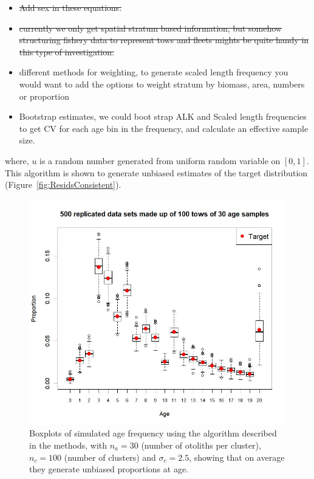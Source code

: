 \begin{itemize}
	\item \sout{Add sex in these equations.}
	\item \sout{currently we only get spatial stratum based information, but somehow structuring fishery data to represent tows and fleets mights be quite handy in this type of investigation.}
	\item different methods for weighting, to generate scaled length frequency you would want to add the options to weight stratum by biomass, area, numbers or proportion
	\item Bootstrap estimates, we could boot strap ALK and Scaled length frequencies to get CV for each age bin in the frequency, and calculate an effective sample size.
\end{itemize}
where, $u$ is a random number generated from uniform random variable on $[0,1]$. This algorithm is shown to generate unbiased estimates of the target distribution (Figure~\ref{fig:ResidsConsistent}).
\begin{figure}[H]
	\centering
	\includegraphics[scale=0.5]{Figures/MH_samples.jpeg}
	\caption{Boxplots of simulated age frequency using the algorithm described in the methods, with $n_a = 30$ (number of otoliths per cluster), $n_c = 100$ (number of clusters) and $\sigma_c = 2.5$, showing that on average they generate unbiased proportions at age.}
	\label{fig:simulated_MH_data}
\end{figure}

